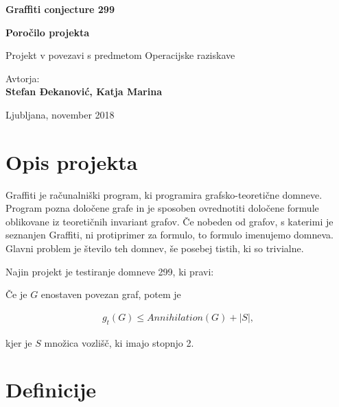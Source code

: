 \documentclass[11pt, a4paper]{article}
\begin{document}
\begin{titlepage}
\begin{center}

\vspace{1cm}
\Huge 
\textbf{Graffiti conjecture 299}

\vspace{0,5cm}
\Large
\textbf{Poročilo projekta}

\vspace{0,5cm}
\large
Projekt v povezavi s predmetom Operacijske raziskave


\vspace{2cm}
\large
Avtorja:\\
\textbf{Stefan Đekanović, Katja Marina}

\vfill

\Large Ljubljana, november 2018
\end{center}
\end{titlepage}

\newpage
\tableofcontents

\newpage
\section{\textbf{Opis projekta}}

Graffiti je računalniški program, ki programira grafsko-teoretične domneve. Program pozna določene grafe in je sposoben ovrednotiti določene formule oblikovane iz teoretičnih invariant grafov.  Če nobeden od grafov, s katerimi je seznanjen Graffiti, ni protiprimer za formulo, to formulo imenujemo domneva. Glavni problem je število teh domnev, še posebej tistih, ki so trivialne. 

\noindent Najin projekt je testiranje domneve 299, ki pravi:

\vspace{0,5cm}
Če je $G$ enostaven povezan graf, potem je 

\begin{align*}
 g_t (G) \leq Annihilation(G) + |S|,
\end{align*}

kjer je $S$ množica vozlišč, ki imajo stopnjo 2. 

\section{\textbf{Definicije}}
\end{document}
